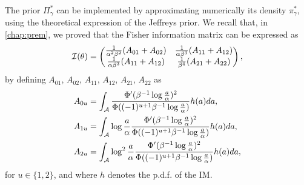 The prior $\varPi_\gamma^\ast$ can be implemented by approximating numerically its density $\pi^\ast_\gamma$, using the theoretical expression of the Jeffreys prior.
We recall that, in   \cref{chap:prem}, we proved that %
the Fisher information matrix can be expressed as 
\begin{equation}
        \mathcal{I}(\theta)=\begin{pmatrix}
        \frac{1}{\alpha^2\beta^2}(A_{01} + A_{02}) & \frac{1}{\alpha\beta^3}(A_{11}+A_{12}) \\
        \frac{1}{\alpha\beta^3}(A_{11}+A_{12}) & \frac{1}{\beta^4}(A_{21}+A_{22})
    \end{pmatrix},
    \end{equation}
by defining 
$A_{01}$, $A_{02}$, $A_{11}$, $A_{12}$, $A_{21}$, $A_{22}$ as
    \begin{equation} %
    \begin{aligned}
        A_{0u} &= \int_\cA\frac{\Phi'(\beta^{-1}\log\frac{a}{\alpha})^2}{\Phi((-1)^{u+1}\beta^{-1}\log\frac{a}{\alpha})}h(a)da,\\
        A_{1u} &= \int_\cA\log\frac{a}{\alpha}\frac{\Phi'(\beta^{-1}\log\frac{a}{\alpha})^2}{\Phi((-1)^{u+1}\beta^{-1}\log\frac{a}{\alpha})}h(a)da,\\
        A_{2u} &= \int_\cA\log^2\frac{a}{\alpha}\frac{\Phi'(\beta^{-1}\log\frac{a}{\alpha})^2}{\Phi((-1)^{u+1}\beta^{-1}\log\frac{a}{\alpha})}h(a)da,
    \end{aligned}
    \end{equation}
for $u\in\{1,2\}$, and where $h$ denotes the p.d.f. of the IM.

